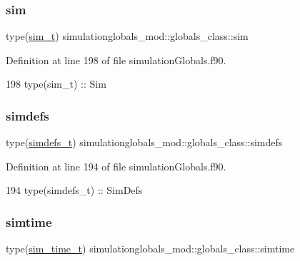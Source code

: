 \subsubsection{\texorpdfstring{sim}{sim}}
{\footnotesize\ttfamily type(\mbox{\hyperlink{structsimulationglobals__mod_1_1sim__t}{sim\+\_\+t}}) simulationglobals\+\_\+mod\+::globals\+\_\+class\+::sim\hspace{0.3cm}{\ttfamily [private]}}



Definition at line 198 of file simulation\+Globals.\+f90.


\begin{DoxyCode}
198         \textcolor{keywordtype}{type}(sim\_t)         :: Sim
\end{DoxyCode}
\mbox{\label{structsimulationglobals__mod_1_1globals__class_aaf8f2208dd36873709a0cc4f8f5862b3}} 
\subsubsection{\texorpdfstring{simdefs}{simdefs}}
{\footnotesize\ttfamily type(\mbox{\hyperlink{structsimulationglobals__mod_1_1simdefs__t}{simdefs\+\_\+t}}) simulationglobals\+\_\+mod\+::globals\+\_\+class\+::simdefs\hspace{0.3cm}{\ttfamily [private]}}



Definition at line 194 of file simulation\+Globals.\+f90.


\begin{DoxyCode}
194         \textcolor{keywordtype}{type}(simdefs\_t)     :: SimDefs
\end{DoxyCode}
\mbox{\label{structsimulationglobals__mod_1_1globals__class_a81dbc69f00c2af7f51f4b2fd962f9297}} 
\subsubsection{\texorpdfstring{simtime}{simtime}}
{\footnotesize\ttfamily type(\mbox{\hyperlink{structsimulationglobals__mod_1_1sim__time__t}{sim\+\_\+time\+\_\+t}}) simulationglobals\+\_\+mod\+::globals\+\_\+class\+::simtime\hspace{0.3cm}{\ttfamily [private]}}



